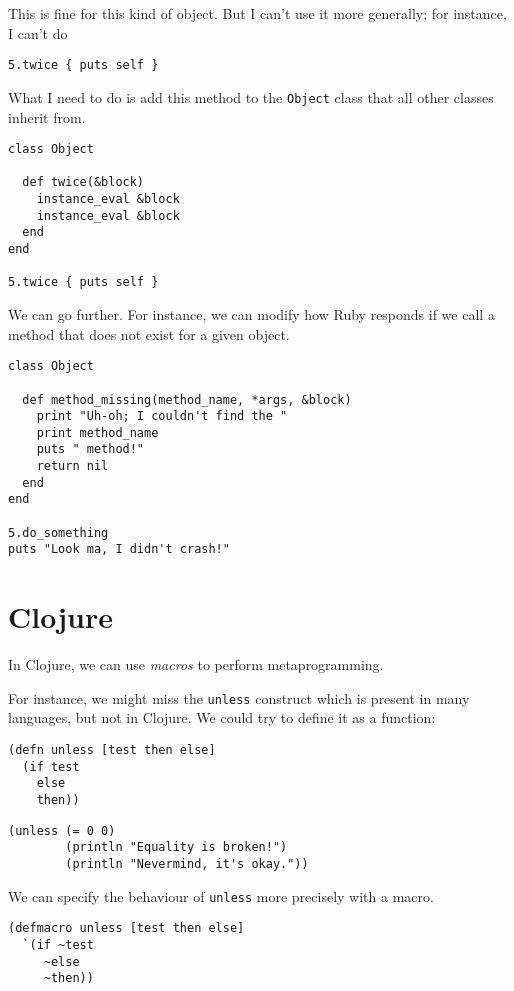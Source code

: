 \documentclass[11pt]{article}
\begin{document}
This is fine for this kind of object. But I can't use it more generally;
for instance, I can't do
\begin{verbatim}
5.twice { puts self }
\end{verbatim}

What I need to do is add this method to the \texttt{Object} class
that all other classes inherit from.
\begin{verbatim}
class Object

  def twice(&block)
    instance_eval &block
    instance_eval &block
  end
end

5.twice { puts self }
\end{verbatim}

We can go further. For instance, we can modify how Ruby responds
if we call a method that does not exist for a given object.
\begin{verbatim}
class Object

  def method_missing(method_name, *args, &block)
    print "Uh-oh; I couldn't find the "
    print method_name
    puts " method!"
    return nil
  end
end

5.do_something
puts "Look ma, I didn't crash!"
\end{verbatim}

\section{Clojure}
\label{sec:orgf7f3395}
In Clojure, we can use \emph{macros} to perform metaprogramming.

For instance, we might miss the \texttt{unless} construct which is
present in many languages, but not in Clojure.
We could try to define it as a function:
\begin{verbatim}
(defn unless [test then else]
  (if test
    else
    then))
\end{verbatim}

\begin{verbatim}
(unless (= 0 0)
        (println "Equality is broken!")
        (println "Nevermind, it's okay."))
\end{verbatim}

We can specify the behaviour of \texttt{unless} more precisely with a macro.
\begin{verbatim}
(defmacro unless [test then else]
  `(if ~test
     ~else
     ~then))
\end{verbatim}
\end{document}
